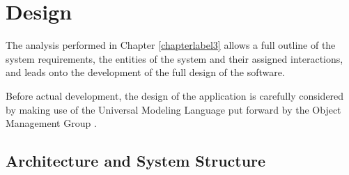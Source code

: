 \chapter{Design}
\label{chapterlabel4}

The analysis performed in Chapter \ref{chapterlabel3} allows a full outline of the system requirements, the entities of the system and their assigned interactions, and leads onto the development of the full design of the software. 

Before actual development, the design of the application is carefully considered by making use of the Universal Modeling Language put forward by the Object Management Group \cite{objectManagementGroup}. \cite{principlesOfAgile} \cite{Managing_Information}



\section{Architecture and System Structure}
\label{sub:Architecture_And_System_Structure}



